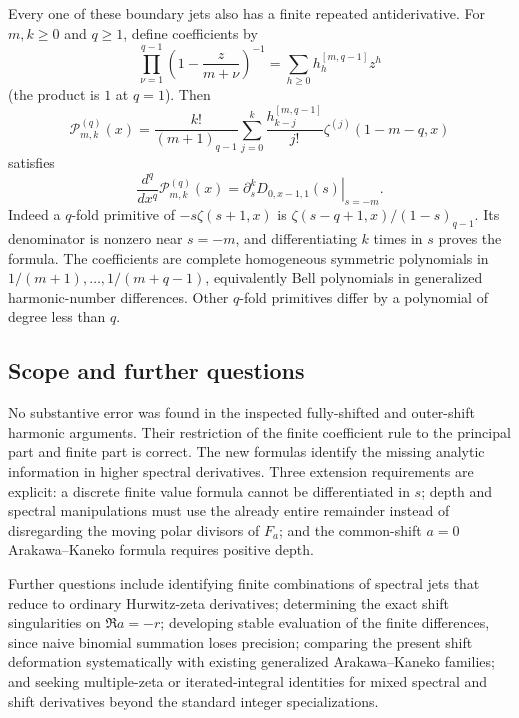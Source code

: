 Every one of these boundary jets also has a finite repeated
antiderivative. For $m,k\ge0$ and $q\ge1$, define coefficients by
\[
 \prod_{\nu=1}^{q-1}\left(1-\frac z{m+\nu}\right)^{-1}
     =\sum_{h\ge0}h_h^{[m,q-1]}z^h
\]
(the product is $1$ at $q=1$). Then
\begin{equation}\label{hn:eq:boundary-primitives}
 \mathcal P_{m,k}^{(q)}(x)=\frac{k!}{(m+1)_{q-1}}
       \sum_{j=0}^k\frac{h_{k-j}^{[m,q-1]}}{j!}
                    \zeta^{(j)}(1-m-q,x)
\end{equation}
satisfies
\[
 \frac{d^q}{dx^q}\mathcal P_{m,k}^{(q)}(x)
       =\left.\partial_s^kD_{0,x-1,1}(s)\right|_{s=-m}.
\]
Indeed a $q$-fold primitive of $-s\zeta(s+1,x)$ is
$\zeta(s-q+1,x)/(1-s)_{q-1}$. Its denominator is nonzero near
$s=-m$, and differentiating $k$ times in $s$ proves the formula.
The coefficients are complete homogeneous symmetric polynomials
in $1/(m+1),\ldots,1/(m+q-1)$, equivalently Bell polynomials in
generalized harmonic-number differences. Other $q$-fold
primitives differ by a polynomial of degree less than $q$.

\subsection{Scope and further questions}

No substantive error was found in the inspected fully-shifted
and outer-shift harmonic arguments. Their restriction of the
finite coefficient rule to the principal part and finite part
is correct. The new formulas identify the missing analytic
information in higher spectral derivatives. Three extension
requirements are explicit: a discrete finite value formula
cannot be differentiated in $s$; depth and spectral manipulations
must use the already entire remainder instead of disregarding
the moving polar divisors of $F_a$; and the common-shift $a=0$
Arakawa--Kaneko formula requires positive depth.

Further questions include identifying finite combinations of
spectral jets that reduce to ordinary Hurwitz-zeta derivatives;
determining the exact shift singularities on $\Re a=-r$;
developing stable evaluation of the finite differences, since
naive binomial summation loses precision; comparing the present
shift deformation systematically with existing generalized
Arakawa--Kaneko families; and seeking multiple-zeta or
iterated-integral identities for mixed spectral and shift
derivatives beyond the standard integer specializations.

